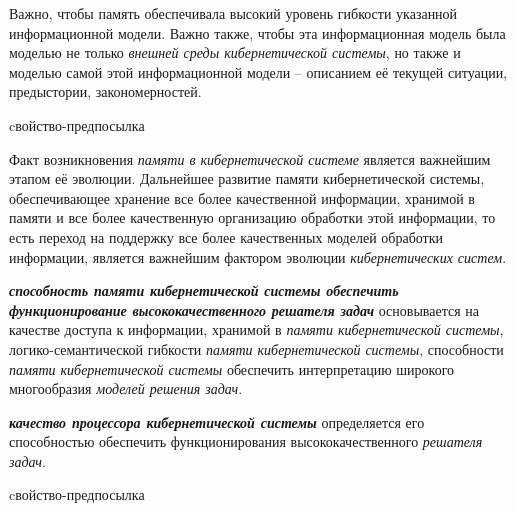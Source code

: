 Важно, чтобы память обеспечивала высокий уровень гибкости указанной информационной модели. Важно также, чтобы эта информационная модель была моделью не только \textit{внешней среды кибернетической системы}, но также и моделью самой этой информационной модели – описанием её текущей ситуации, предыстории, закономерностей.

\begin{SCn}
\begin{scnrelfromlist}{cвойство-предпосылка}
\end{scnrelfromlist}
\end{SCn}

Факт возникновения \textit{памяти в кибернетической системе} является важнейшим этапом её эволюции.
Дальнейшее развитие памяти кибернетической системы, обеспечивающее хранение все более качественной информации, хранимой в памяти и все более качественную организацию обработки этой информации, то есть переход на поддержку все более качественных моделей обработки информации, является важнейшим фактором эволюции \textit{кибернетических систем}.

\textbf{\textit{способность \textit{памяти кибернетической системы} обеспечить функционирование высококачественного \textit{решателя задач}}} основывается на качестве доступа к информации, хранимой в \textit{памяти кибернетической системы}, логико-семантической гибкости \textit{памяти кибернетической системы}, способности \textit{памяти кибернетической системы} обеспечить интерпретацию широкого многообразия \textit{моделей решения задач}.

\textbf{\textit{качество процессора кибернетической системы}} определяется его способностью обеспечить функционирования высококачественного \textit{решателя задач}.

\begin{SCn}
\begin{scnrelfromlist}{cвойство-предпосылка}
\end{scnrelfromlist}
\end{SCn}

